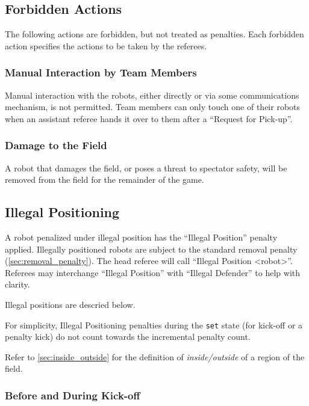 \subsection{Forbidden Actions}

The following actions are forbidden, but not treated as penalties.
Each forbidden action specifies the actions to be taken by the referees.

\subsubsection{Manual Interaction by Team Members}

Manual interaction with the robots, either directly or via some communications mechanism, is not permitted.
Team members can only touch one of their robots when an assistant referee hands it over to them after a ``Request for Pick-up''.

\subsubsection{Damage to the Field}
\label{sec:damage}

A robot that damages the field, or poses a threat to spectator safety, will be removed from the field for the remainder of the game.

\subsection{Illegal Positioning}
\label{sec:illegal_positioning}

A robot penalized under illegal position has the ``Illegal Position'' penalty applied.
Illegally positioned robots are subject to the standard removal penalty (\cf \cref{sec:removal_penalty}).
The head referee will call ``Illegal Position  \textless robot\textgreater''.
Referees may interchange ``Illegal Position'' with ``Illegal Defender'' to help with clarity.

Illegal positions are descried below.

For simplicity, Illegal Positioning penalties during the \texttt{set} state (for kick-off or a penalty kick) do not count towards the incremental penalty count.

Refer to \cref{sec:inside_outside} for the definition of \textit{inside/outside} of a region of the field.

\subsubsection{Before and During Kick-off}
\label{sec:ip_kick_off}

